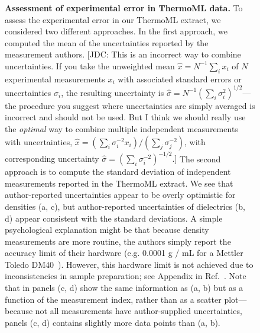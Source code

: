 \documentclass[aps,pre,twocolumn,nofootinbib,superscriptaddress,linenumbers]{revtex4-1}
\begin{document}
\begin{figure}
\caption{{\bf Assessment of experimental error in ThermoML data.}
To assess the experimental error in our ThermoML extract, we considered two different approaches.
In the first approach, we computed the mean of the uncertainties reported by the measurement authors.  
{\color{red}[JDC: This is an incorrect way to combine uncertainties.  If you take the unweighted mean $\hat{x} = N^{-1} \sum_i x_i$ of $N$ experimental measurements $x_i$ with associated standard errors or uncertainties $\sigma_i$,  the resulting uncertainty is $\hat\sigma = N^{-1} (\sum_i \sigma_i^2)^{1/2}$---the procedure you suggest where uncertainties are simply averaged is incorrect and should not be used.  But I think we should really use the \emph{optimal} way to combine multiple independent measurements with uncertainties, $\hat{x} = (\sum_i \sigma_i^{-2} x_i) / (\sum_j \sigma_j^{-2})$, with corresponding uncertainty $\hat{\sigma} = (\sum_i \sigma_i^{-2})^{-1/2}$.]}
The second approach is to compute the standard deviation of independent measurements reported in the ThermoML extract.   
We see that author-reported uncertainties appear to be overly optimistic for densities (a, c), but author-reported uncertainties of dielectrics (b, d) appear consistent with the standard deviations.  
A simple psychological explanation might be that because density measurements are more routine, the authors simply report the accuracy limit of their hardware (e.g. 0.0001 g / mL for a Mettler Toledo DM40~\cite{mettlertoledo}).  
However, this hardware limit is not achieved due to inconsistencies in sample preparation; see Appendix in Ref.~\cite{chirico2013improvement}.  
Note that in panels (c, d) show the same information as (a, b) but as a function of the measurement index, rather than as a scatter plot---because not all measurements have author-supplied uncertainties, panels (c, d) contains slightly more data points than (a, b).  
}
\label{figure:ErrorAnalysis}

\end{figure}
\end{document}
